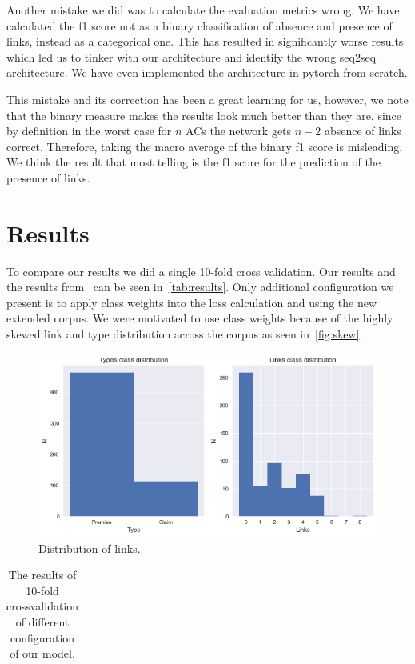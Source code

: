\documentclass[onecolumn]{article}
\begin{document}
Another mistake we did was to calculate the evaluation metrics wrong.
We have calculated the f1 score not as a binary classification of absence and presence of links, instead as a categorical one.
This has resulted in significantly worse results which led us to tinker with our architecture and identify the wrong seq2seq architecture. We have even implemented the architecture in pytorch from scratch.

This mistake and its correction has been a great learning for us, however, we note that the binary measure makes the results look much better than they are,
since by definition in the worst case for $n$ ACs the network gets $n-2$ absence of links correct. Therefore, taking the macro average of the binary f1 score is misleading. We think the result that most telling is the f1 score for the prediction of the presence of links.

\section{Results}
To compare our results we did a single 10-fold cross validation. Our results and the results from~\cite{potash2017here} can be seen in~\autoref{tab:results}.
Only additional configuration we present is to apply class weights into the loss calculation and using the new extended corpus.
We were motivated to use class weights because of the highly skewed link and type distribution across the corpus as seen in~\autoref{fig:skew}.

\begin{figure}[h]
    \centering
    \includegraphics[width=0.4\linewidth]{fig/dist.png}
    \caption{Distribution of links.}\label{fig:skew}
\end{figure}

\begin{table}[h]
    \centering
    \caption{The results of 10-fold crossvalidation of different configuration of our model.}
    \label{tab:label}
    \begin{tabular}{c}
        
    \end{tabular}
\end{table}
\end{document}
